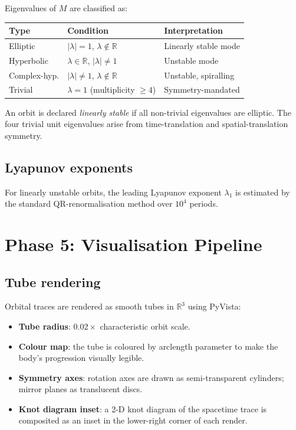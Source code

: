 \documentclass[12pt, a4paper]{article}
\theoremstyle{definition}
\newcommand{\R}{\mathbb{R}}
\begin{document}
Eigenvalues of $M$ are classified as:
\begin{center}
\begin{tabular}{lll}
\toprule
\textbf{Type} & \textbf{Condition} & \textbf{Interpretation} \\
\midrule
Elliptic         & $|\lambda| = 1$, $\lambda \notin \R$  & Linearly stable mode \\
Hyperbolic       & $\lambda \in \R$, $|\lambda| \neq 1$  & Unstable mode \\
Complex-hyp.     & $|\lambda| \neq 1$, $\lambda \notin \R$ & Unstable, spiralling \\
Trivial          & $\lambda = 1$ (multiplicity $\geq 4$) & Symmetry-mandated \\
\bottomrule
\end{tabular}
\end{center}

An orbit is declared \emph{linearly stable} if all non-trivial eigenvalues
are elliptic.  The four trivial unit eigenvalues arise from time-translation
and spatial-translation symmetry.

\subsection{Lyapunov exponents}

For linearly unstable orbits, the leading Lyapunov exponent $\lambda_1$
is estimated by the standard QR-renormalisation method over $10^4$ periods.

\section{Phase 5: Visualisation Pipeline}

\subsection{Tube rendering}

Orbital traces are rendered as smooth tubes in $\R^3$ using PyVista:
\begin{itemize}[leftmargin=1.8em]
  \item \textbf{Tube radius}: $0.02 \times$ characteristic orbit scale.
  \item \textbf{Colour map}: the tube is coloured by arclength parameter to
        make the body's progression visually legible.
  \item \textbf{Symmetry axes}: rotation axes are drawn as semi-transparent
        cylinders; mirror planes as translucent discs.
  \item \textbf{Knot diagram inset}: a 2-D knot diagram of the spacetime trace
        is composited as an inset in the lower-right corner of each render.
\end{itemize}
\end{document}
